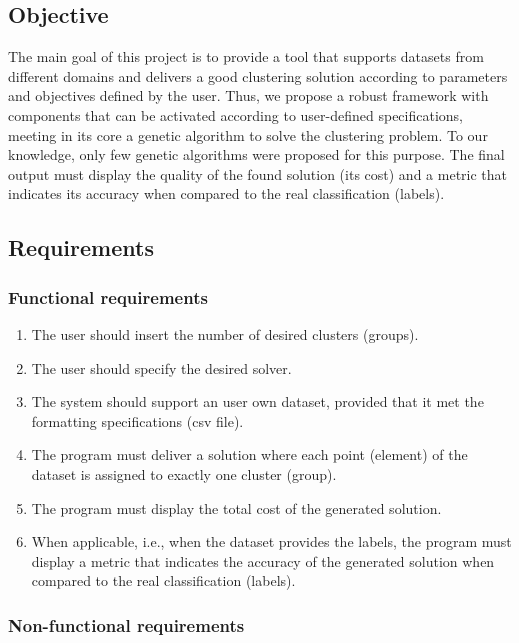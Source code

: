 \documentclass[10pt]{article}
\begin{document}
\subsection{Objective}
The main goal of this project is to provide a tool that supports datasets from different domains and delivers a good clustering solution according to parameters and objectives defined by the user. Thus, we propose a robust framework with components that can be activated according to user-defined specifications, meeting in its core a genetic algorithm to solve the clustering problem. To our knowledge, only few genetic algorithms were proposed for this purpose. The final output must display the quality of the found solution (its cost) and a metric that indicates its accuracy when compared to the real classification (labels).

\subsection{Requirements}

\subsubsection{Functional requirements}

\begin{enumerate}
	\item The user should insert the number of desired clusters (groups).

	\item The user should specify the desired solver.

	\item The system should support an user own dataset, provided that it met the formatting specifications (csv file).
	
	\item The program must deliver a solution where each point (element) of the dataset is assigned to exactly  one cluster (group).

	\item The program must display the total cost of the generated solution.

	\item When applicable, i.e., when the dataset provides the labels, the program must display a metric that indicates the accuracy of the generated solution when compared to the real classification (labels).
\end{enumerate}

\subsubsection{Non-functional requirements}
\end{document}
